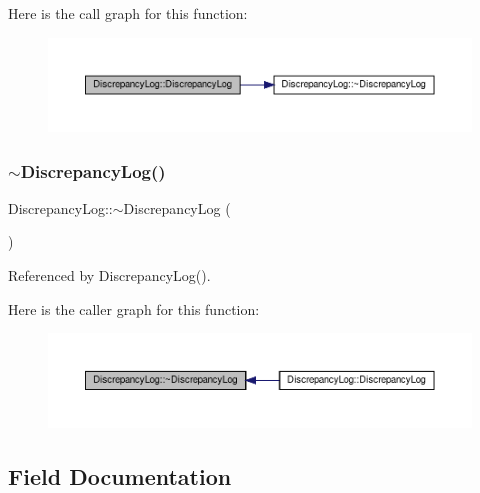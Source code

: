 Here is the call graph for this function\+:
\nopagebreak
\begin{figure}[H]
\begin{center}
\leavevmode
\includegraphics[width=350pt]{dc/d3d/structDiscrepancyLog_a4aeef0545b10b424577486acd4f5cc4c_cgraph}
\end{center}
\end{figure}
\mbox{\label{structDiscrepancyLog_ab2c76140d93db653da99ae6629e9d9a8}} 
\subsubsection{\texorpdfstring{$\sim$\+Discrepancy\+Log()}{~DiscrepancyLog()}}
{\footnotesize\ttfamily Discrepancy\+Log\+::$\sim$\+Discrepancy\+Log (\begin{DoxyParamCaption}{ }\end{DoxyParamCaption})\hspace{0.3cm}{\ttfamily [default]}}



Referenced by Discrepancy\+Log().

Here is the caller graph for this function\+:
\nopagebreak
\begin{figure}[H]
\begin{center}
\leavevmode
\includegraphics[width=350pt]{dc/d3d/structDiscrepancyLog_ab2c76140d93db653da99ae6629e9d9a8_icgraph}
\end{center}
\end{figure}


\subsection{Field Documentation}
\mbox{\label{structDiscrepancyLog_a4c9c822556d479b60dc9829249698fc9}} 
